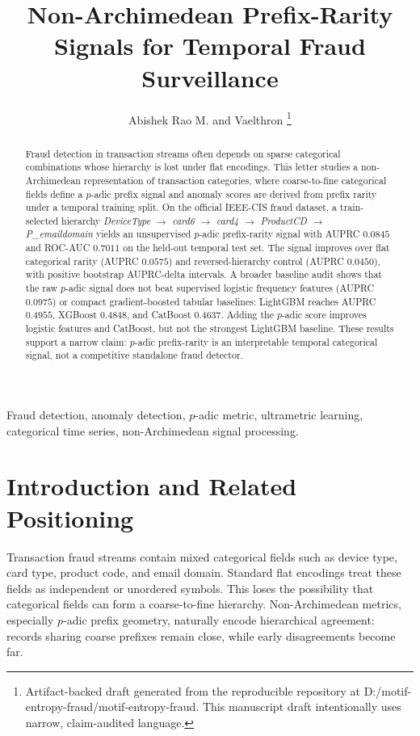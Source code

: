 \documentclass[journal]{IEEEtran}
\title{Non-Archimedean Prefix-Rarity Signals for Temporal Fraud Surveillance}
\author{Abishek Rao M. and Vaelthron%
\thanks{Artifact-backed draft generated from the reproducible repository at D:/motif-entropy-fraud/motif-entropy-fraud. This manuscript draft intentionally uses narrow, claim-audited language.}}
\begin{document}
\maketitle

\begin{abstract}
Fraud detection in transaction streams often depends on sparse categorical combinations whose hierarchy is lost under flat encodings. This letter studies a non-Archimedean representation of transaction categories, where coarse-to-fine categorical fields define a $p$-adic prefix signal and anomaly scores are derived from prefix rarity under a temporal training split. On the official IEEE-CIS fraud dataset, a train-selected hierarchy \emph{DeviceType $\rightarrow$ card6 $\rightarrow$ card4 $\rightarrow$ ProductCD $\rightarrow$ P\_emaildomain} yields an unsupervised $p$-adic prefix-rarity signal with AUPRC $0.0845$ and ROC-AUC $0.7011$ on the held-out temporal test set. The signal improves over flat categorical rarity (AUPRC $0.0575$) and reversed-hierarchy control (AUPRC $0.0450$), with positive bootstrap AUPRC-delta intervals. A broader baseline audit shows that the raw $p$-adic signal does not beat supervised logistic frequency features (AUPRC $0.0975$) or compact gradient-boosted tabular baselines: LightGBM reaches AUPRC $0.4955$, XGBoost $0.4848$, and CatBoost $0.4637$. Adding the $p$-adic score improves logistic features and CatBoost, but not the strongest LightGBM baseline. These results support a narrow claim: $p$-adic prefix-rarity is an interpretable temporal categorical signal, not a competitive standalone fraud detector.
\end{abstract}

\begin{IEEEkeywords}
Fraud detection, anomaly detection, $p$-adic metric, ultrametric learning, categorical time series, non-Archimedean signal processing.
\end{IEEEkeywords}

\section{Introduction and Related Positioning}
Transaction fraud streams contain mixed categorical fields such as device type, card type, product code, and email domain. Standard flat encodings treat these fields as independent or unordered symbols. This loses the possibility that categorical fields can form a coarse-to-fine hierarchy. Non-Archimedean metrics, especially $p$-adic prefix geometry, naturally encode hierarchical agreement: records sharing coarse prefixes remain close, while early disagreements become far.
\end{document}
